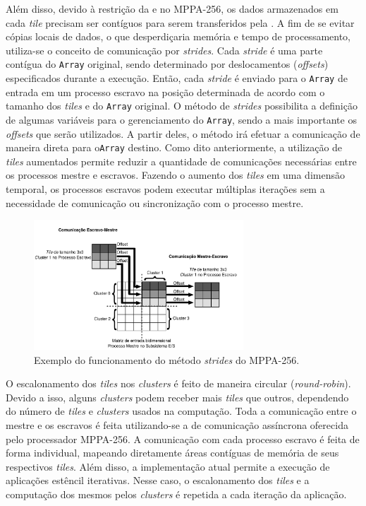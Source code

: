 \documentclass[12pt]{article}
\newcommand{\mppa}{MPPA-256\xspace}
\begin{document}
Além disso, devido à restrição da \api e \noc no \mppa, os dados armazenados em
cada \textit{tile} precisam ser contíguos para serem transferidos pela \noc. A
fim de se evitar cópias locais de dados, o que desperdiçaria memória e tempo de
processamento, utiliza-se o conceito de comunicação por \textit{strides}. Cada
\textit{stride} é uma parte contígua do \texttt{Array} original, sendo
determinado por deslocamentos (\textit{offsets}) especificados durante a
execução. Então, cada \textit{stride} é enviado para o \texttt{Array} de entrada
em um processo escravo na posição determinada de acordo com o tamanho dos
\textit{tiles} e do \texttt{Array} original. O método de \textit{strides}
possibilita a definição de algumas variáveis para o gerenciamento do
\texttt{Array}, sendo a mais importante os \textit{offsets} que serão
utilizados. A partir deles, o método irá efetuar a comunicação de maneira direta
para o\texttt{Array} destino. Como dito anteriormente, a utilização de
\textit{tiles} aumentados permite reduzir a quantidade de comunicações
necessárias entre os processos mestre e escravos. Fazendo o aumento dos
\textit{tiles} em uma dimensão temporal, os processos escravos podem executar
múltiplas iterações sem a necessidade de comunicação ou sincronização com o
processo mestre.

\begin{figure}[t]
	\centering
	\includegraphics[width=0.7\textwidth]{figs/stridesImage.pdf}
	\caption{Exemplo do funcionamento do método \textit{strides} do \mppa.}
	\label{fig:strides}
\end{figure}

O escalonamento dos \textit{tiles} nos \textit{clusters} é feito de maneira
circular (\textit{round-robin}). Devido a isso, alguns \textit{clusters} podem
receber mais \textit{tiles} que outros, dependendo do número de \textit{tiles} e
\textit{clusters} usados na computação. Toda a comunicação entre o mestre e os
escravos é feita utilizando-se a \api de comunicação assíncrona oferecida pelo
processador \mppa. A comunicação com cada processo escravo é feita de forma
individual, mapeando diretamente áreas contíguas de memória de seus respectivos
\textit{tiles}. Além disso, a implementação atual permite a execução de
aplicações estêncil iterativas. Nesse caso, o escalonamento dos \textit{tiles} e
a computação dos mesmos pelos \textit{clusters} é repetida a cada iteração da
aplicação.
\end{document}
